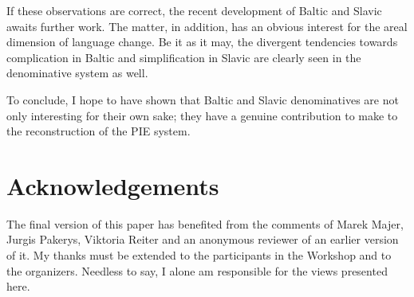 \documentclass[output=paper,colorlinks,citecolor=brown]{langscibook}
\begin{document}
If these observations are correct, the recent development of Baltic and Slavic awaits further work. The matter, in addition, has an obvious interest for the areal dimension of language change. Be it as it may, the divergent tendencies towards complication in Baltic and simplification in Slavic are clearly seen in the denominative system as well.

To conclude, I hope to have shown that Baltic and Slavic denominatives are not only interesting for their own sake; they have a genuine contribution to make to the reconstruction of the PIE system.

\section*{Acknowledgements}

The final version of this paper has benefited from the comments of Marek Majer, Jurgis Pakerys, Viktoria Reiter and an anonymous reviewer of an earlier version of it. My thanks must be extended to the participants in the Workshop and to the organizers. Needless to say, I alone am responsible for the views presented here. 
 
 
\end{document}
